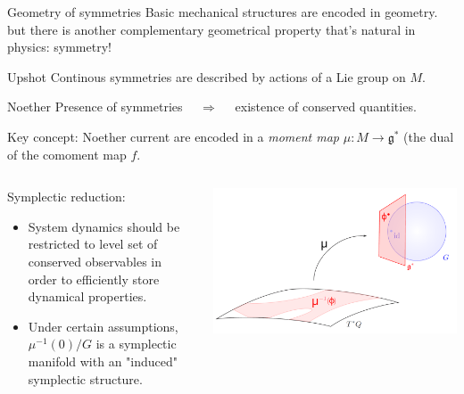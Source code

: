 \documentclass[beamer,10pt,handout]{standalone}  \Handouttrue
\begin{document}
\begin{frame}{Geometry of symmetries}\label{frame:geometrysymmetries}
	Basic mechanical structures are encoded in geometry. but there is another complementary geometrical property that's natural in physics: symmetry!
	\begin{alertblock}{Upshot}
		Continous symmetries are described by actions of a Lie group on $M$.
	\end{alertblock}
	\begin{block}{Noether}
		Presence of symmetries $\quad \Rightarrow \quad$ existence of conserved quantities.
	\end{block}	
	\begin{block}{Key concept:}
		Noether current are encoded in a \emph{moment map}  $\mu :M \rightarrow \mathfrak{g}^*$ (the dual of the comoment map $f$. 
	\end{block}
  \begin{columns}[T]
   	\begin{column}{.6\textwidth}
			\begin{block}{Symplectic reduction:}
			\begin{itemize}
				\item System dynamics should be restricted to level set of conserved observables in order to efficiently store dynamical properties.
				\item Under certain assumptions, $\mu^{-1}( 0 )/G$ is a symplectic manifold with an "induced" symplectic structure.
			\end{itemize}
			\end{block}
    \end{column}
    \begin{column}{.4\textwidth}	
			\includegraphics[width=\textwidth]{Pictures/Reduction} 
  	\end{column}
	\end{columns}			
\end{frame}
\note{
}
\end{document}

